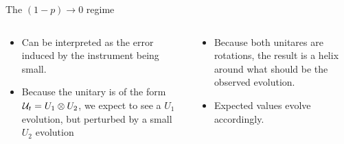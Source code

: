 \begin{frame}{The $(1-p)\rightarrow 0$ regime}
    \begin{columns}
        \begin{column}{0.5\textwidth}
            \begin{itemize}
                \item  Can be interpreted as the error induced by the instrument being small.
                \item  Because the unitary is of the form $\mathcal{U}_{t}=U_{1}\otimes U_{2}$, we expect to see a $U_{1}$ evolution, but perturbed by a small $U_{2}$ evolution
            \end{itemize}
        \end{column}
        \begin{column}{0.5\textwidth}
            \begin{itemize}
                \item Because both unitares are rotations, the result is a helix around what should be the observed evolution.
                \item Expected values evolve accordingly.
            \end{itemize}
        \end{column}
    \end{columns}
\end{frame}

